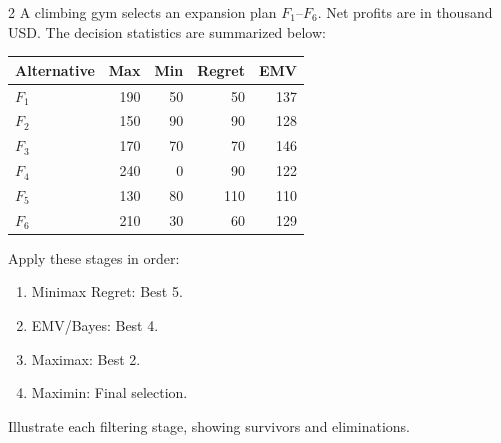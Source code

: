 \begin{multicols}{2}
\raggedcolumns
{}
A climbing gym selects an expansion plan $F_1$--$F_6$. Net profits are in thousand USD. The decision statistics are summarized below:
\vspace{-3mm}
\begin{center}\small\setlength{\tabcolsep}{4pt}
	\begin{tabular}{lrrrr}\toprule
		Alternative & Max & Min & Regret & EMV\\ \midrule
		$F_1$ & 190 & 50 & 50 & 137\\
		$F_2$ & 150 & 90 & 90 & 128\\
		$F_3$ & 170 & 70 & 70 & 146\\
		$F_4$ & 240 & 0 & 90 & 122\\
		$F_5$ & 130 & 80 & 110 & 110\\
		$F_6$ & 210 & 30 & 60 & 129\\
		\bottomrule
	\end{tabular}
\end{center}
\vspace{-3mm}
Apply these stages in order:
\begin{enumerate}[leftmargin=*]
	\item Minimax Regret: Best 5.
	\item EMV/Bayes: Best 4.
	\item Maximax: Best 2.
	\item Maximin: Final selection.
\end{enumerate}
Illustrate each filtering stage, showing survivors and eliminations.



\end{multicols}
